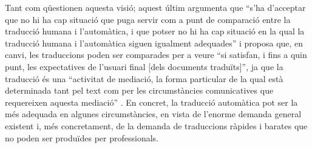Tant \citet{krauwer93j} com \citet{sager93b} qüestionen aquesta visió;
aquest últim argumenta que ``s'ha d'acceptar que no hi ha cap situació
que puga servir com a punt de comparació entre la traducció humana i
l'automàtica, i que potser no hi ha cap situació en la qual la
traducció humana i l'automàtica siguen igualment adequades''
\citep[p.~261]{sager93b} i proposa que, en canvi, les traduccions
poden ser comparades per a veure ``si satisfan, i fins a quin punt,
les expectatives de l'usuari final [dels documents traduïts]'', ja que
la traducció és una ``activitat de mediació, la forma particular de la
qual està determinada tant pel text com per les circumstàncies
comunicatives que requereixen aquesta mediació''
\citep[p.~261]{sager93b}.  En concret, la traducció automàtica pot ser
la més adequada en algunes circumstàncies, en vista de l'enorme
demanda general existent i, més concretament, de la demanda de
traduccions ràpides i barates que no poden ser produïdes per
professionals.


